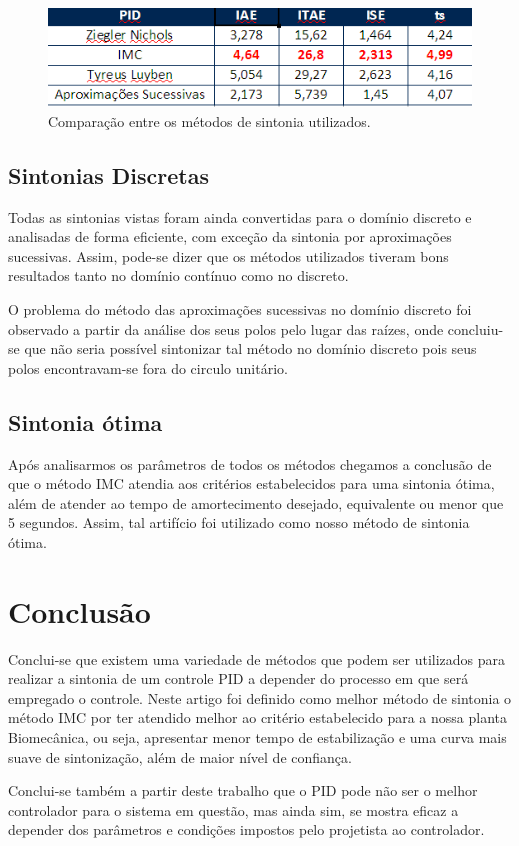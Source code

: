\documentclass[article,12pt,oneside,a4paper,english,brazil,sumario=tradicional]{abntex2}
\begin{document}
\begin{figure}[H]
    \centering
    \includegraphics{comparar.png}
    \caption{Comparação entre os métodos de sintonia utilizados.}
    \label{comparar}
\end{figure}

\subsection{\large Sintonias Discretas}

Todas as sintonias vistas foram ainda convertidas para o domínio discreto e analisadas de forma eficiente, com exceção da sintonia por aproximações sucessivas. Assim, pode-se dizer que os métodos utilizados tiveram bons resultados tanto no domínio contínuo como no discreto. 

O problema do método das aproximações sucessivas no domínio discreto foi observado a partir da análise dos seus polos pelo lugar das raízes, onde concluiu-se que não seria possível sintonizar tal método no domínio discreto pois seus polos encontravam-se fora do circulo unitário. 

\subsection{\large Sintonia ótima}

Após analisarmos os parâmetros de todos os métodos chegamos a conclusão de que o método IMC atendia aos critérios estabelecidos para uma sintonia ótima, além de atender ao tempo de amortecimento desejado, equivalente ou menor que 5 segundos. Assim, tal artifício foi utilizado como nosso método de sintonia ótima. 


\section{\large {Conclusão}}
Conclui-se que existem uma variedade de métodos que podem ser utilizados para realizar a sintonia de um controle PID a depender do processo em que será empregado o controle. Neste artigo foi definido como  melhor método de sintonia o método IMC por ter atendido melhor ao critério estabelecido para a nossa planta Biomecânica, ou seja, apresentar menor tempo de estabilização e uma curva mais suave de sintonização, além de maior nível de confiança.

Conclui-se também a partir deste trabalho que o PID pode não ser o melhor controlador para o sistema em questão, mas ainda sim, se mostra eficaz a depender dos parâmetros e condições impostos pelo projetista ao controlador.



\renewcommand{\bibsection}{\section{\large {REFER\^ENCIAS BIBLIOGR\'AFICAS}}}


\end{document}
